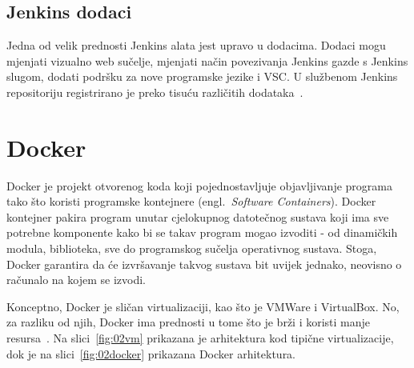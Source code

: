 \subsection{Jenkins dodaci}
Jedna od velik prednosti Jenkins alata jest upravo u dodacima. Dodaci mogu mjenjati vizualno web
sučelje, mjenjati način povezivanja Jenkins gazde s Jenkins slugom, dodati podršku za nove
programske jezike i VSC. U službenom Jenkins repositoriju registrirano je preko tisuću različitih
dodataka~\citep{JenkisPlugins}.


\section{Docker}
Docker je projekt otvorenog koda koji pojednostavljuje objavljivanje programa tako što koristi
programske kontejnere (engl.~\textit{Software Containers}). Docker kontejner pakira program unutar
cjelokupnog datotečnog sustava koji ima sve potrebne komponente kako bi se takav program mogao
izvoditi - od dinamičkih modula, biblioteka, sve do programskog sučelja operativnog sustava. Stoga,
Docker garantira da će izvršavanje takvog sustava bit uvijek jednako, neovisno o računalo na kojem
se izvodi.

Konceptno, Docker je sličan virtualizaciji, kao što je VMWare i VirtualBox. No, za razliku od njih,
Docker ima prednosti u tome što je brži i koristi manje resursa~\citep{leszko2017continuous}. Na
slici~\ref{fig:02vm} prikazana je arhitektura kod tipične virtualizacije, dok je na
slici~\ref{fig:02docker} prikazana  Docker arhitektura.

